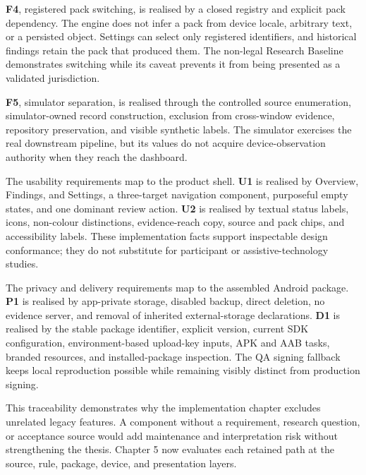 \textbf{F4}, registered pack switching, is realised by a closed registry and explicit pack dependency. The engine does not infer a pack from device locale, arbitrary text, or a persisted object. Settings can select only registered identifiers, and historical findings retain the pack that produced them. The non-legal Research Baseline demonstrates switching while its caveat prevents it from being presented as a validated jurisdiction.

\textbf{F5}, simulator separation, is realised through the controlled source enumeration, simulator-owned record construction, exclusion from cross-window evidence, repository preservation, and visible synthetic labels. The simulator exercises the real downstream pipeline, but its values do not acquire device-observation authority when they reach the dashboard.

The usability requirements map to the product shell. \textbf{U1} is realised by Overview, Findings, and Settings, a three-target navigation component, purposeful empty states, and one dominant review action. \textbf{U2} is realised by textual status labels, icons, non-colour distinctions, evidence-reach copy, source and pack chips, and accessibility labels. These implementation facts support inspectable design conformance; they do not substitute for participant or assistive-technology studies.

The privacy and delivery requirements map to the assembled Android package. \textbf{P1} is realised by app-private storage, disabled backup, direct deletion, no evidence server, and removal of inherited external-storage declarations. \textbf{D1} is realised by the stable package identifier, explicit version, current SDK configuration, environment-based upload-key inputs, APK and AAB tasks, branded resources, and installed-package inspection. The QA signing fallback keeps local reproduction possible while remaining visibly distinct from production signing.

This traceability demonstrates why the implementation chapter excludes unrelated legacy features. A component without a requirement, research question, or acceptance source would add maintenance and interpretation risk without strengthening the thesis. Chapter 5 now evaluates each retained path at the source, rule, package, device, and presentation layers.
